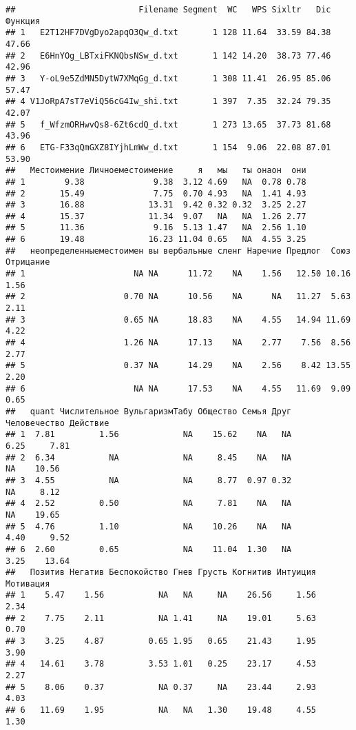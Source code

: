 \documentclass[
]{article}
\begin{document}
\begin{verbatim}
##                         Filename Segment  WC   WPS Sixltr   Dic Функция
## 1   E2T12HF7DVgDyo2apqO3Qw_d.txt       1 128 11.64  33.59 84.38   47.66
## 2   E6HnYOg_LBTxiFKNQbsNSw_d.txt       1 142 14.20  38.73 77.46   42.96
## 3   Y-oL9e5ZdMN5DytW7XMqGg_d.txt       1 308 11.41  26.95 85.06   57.47
## 4 V1JoRpA7sT7eViQ56cG4Iw_shi.txt       1 397  7.35  32.24 79.35   42.07
## 5   f_WfzmORHwvQs8-6Zt6cdQ_d.txt       1 273 13.65  37.73 81.68   43.96
## 6   ETG-F33qQmGXZ8IYjhLmWw_d.txt       1 154  9.06  22.08 87.01   53.90
##   Местоимение Личноеместоимение     я   мы   ты онаон  они
## 1        9.38              9.38  3.12 4.69   NA  0.78 0.78
## 2       15.49              7.75  0.70 4.93   NA  1.41 4.93
## 3       16.88             13.31  9.42 0.32 0.32  3.25 2.27
## 4       15.37             11.34  9.07   NA   NA  1.26 2.77
## 5       11.36              9.16  5.13 1.47   NA  2.56 1.10
## 6       19.48             16.23 11.04 0.65   NA  4.55 3.25
##   неопределенныеместоимен вы вербальные сленг Наречие Предлог  Союз Отрицание
## 1                      NA NA      11.72    NA    1.56   12.50 10.16      1.56
## 2                    0.70 NA      10.56    NA      NA   11.27  5.63      2.11
## 3                    0.65 NA      18.83    NA    4.55   14.94 11.69      4.22
## 4                    1.26 NA      17.13    NA    2.77    7.56  8.56      2.77
## 5                    0.37 NA      14.29    NA    2.56    8.42 13.55      2.20
## 6                      NA NA      17.53    NA    4.55   11.69  9.09      0.65
##   quant Числительное ВульгаризмТабу Общество Семья Друг Человечество Действие
## 1  7.81         1.56             NA    15.62    NA   NA         6.25     7.81
## 2  6.34           NA             NA     8.45    NA   NA           NA    10.56
## 3  4.55           NA             NA     8.77  0.97 0.32           NA     8.12
## 4  2.52         0.50             NA     7.81    NA   NA           NA    19.65
## 5  4.76         1.10             NA    10.26    NA   NA         4.40     9.52
## 6  2.60         0.65             NA    11.04  1.30   NA         3.25    13.64
##   Позитив Негатив Беспокойство Гнев Грусть Когнитив Интуиция Мотивация
## 1    5.47    1.56           NA   NA     NA    26.56     1.56      2.34
## 2    7.75    2.11           NA 1.41     NA    19.01     5.63      0.70
## 3    3.25    4.87         0.65 1.95   0.65    21.43     1.95      3.90
## 4   14.61    3.78         3.53 1.01   0.25    23.17     4.53      2.27
## 5    8.06    0.37           NA 0.37     NA    23.44     2.93      4.03
## 6   11.69    1.95           NA   NA   1.30    19.48     4.55      1.30

\end{verbatim}
\end{document}
